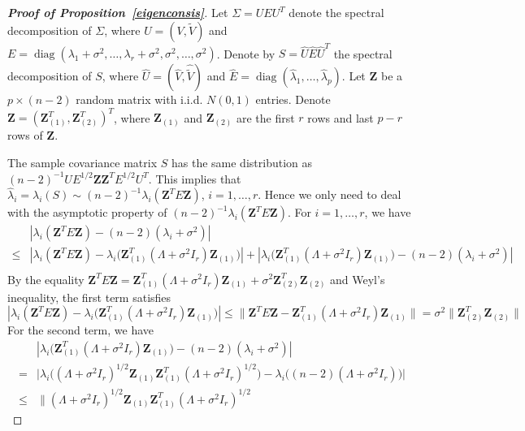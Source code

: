 \documentclass[review]{elsarticle}
\DeclareMathOperator{\mydiag}{diag}
\newcommand{\bZ}{\mathbf{Z}}
\theoremstyle{plain}
\theoremstyle{definition}
\theoremstyle{remark}
\begin{document}
\begin{proof}[\textbf{Proof of Proposition~\ref{eigenconsis}}]
    Let $\Sigma=UEU^T$ denote the spectral decomposition of $\Sigma$, where
     $U=(V,\tilde{V})$ and $E=\mydiag(\lambda_1+\sigma^2,\ldots,\lambda_r+\sigma^2,\sigma^2,\ldots,\sigma^2)$.
Denote by $S=\hat{U}\hat{E}\hat{U}^T$ the spectral decomposition of $S$, where $\hat{U}=(\hat{V},\hat{\tilde{V}})$ and $\hat{E}=\mydiag(\hat{\lambda}_1,\ldots,\hat{\lambda}_p)$.
Let $\bZ$ be a $p\times (n-2)$ random matrix with i.i.d. $N(0,1)$ entries.
Denote $\bZ={(\bZ_{(1)}^T,\bZ_{(2)}^T)}^T$, where $\bZ_{(1)}$ and $\bZ_{(2)}$ are the first $r$ rows and last $p-r$ rows of $\bZ$. 

    {\color{red}
The sample covariance matrix $S$ has the same distribution as
$
    {(n-2)}^{-1} U E^{1/2} \bZ \bZ^T E^{1/2} U^T
$.
This implies that $\hat{\lambda}_i=\lambda_i(S)\sim (n-2)^{-1}\lambda_i(\bZ^T E \bZ)$, $i=1,\ldots,r$.
Hence we only need to deal with the asymptotic property of $(n-2)^{-1}\lambda_i(\bZ^T E \bZ)$.
For $i=1,\ldots,r$, we have
    \begin{equation*}
        \begin{aligned}
            &|\lambda_i(\bZ^T E \bZ)-(n-2)(\lambda_i +\sigma^2)|\\
            \leq&
            |\lambda_i(\bZ^T E \bZ)-\lambda_i \big(\bZ_{(1)}^T(\Lambda+\sigma^2 I_r)\bZ_{(1)}\big)|
            +
|\lambda_i \big(\bZ_{(1)}^T(\Lambda+\sigma^2 I_r)\bZ_{(1)}\big)
        -(n-2)(\lambda_i +\sigma^2)|\\
        \end{aligned}
    \end{equation*}
    By the equality
$
    \bZ^T E \bZ= \bZ_{(1)}^T (\Lambda +\sigma^2 I_r) \bZ_{(1)}+
\sigma^2 \bZ_{(2)}^T  \bZ_{(2)}
$
and Weyl's inequality, the first term satisfies
$$
            |\lambda_i(\bZ^T E \bZ)-\lambda_i \big(\bZ_{(1)}^T(\Lambda+\sigma^2 I_r)\bZ_{(1)}\big)|
            \leq \|\bZ^T E \bZ-\bZ_{(1)}^T(\Lambda+\sigma^2 I_r)\bZ_{(1)}\|
            =\sigma^2\|\bZ_{(2)}^T  \bZ_{(2)}\|
    $$
For the second term, we have
$$
    \begin{aligned}
        &|\lambda_i \big(\bZ_{(1)}^T(\Lambda+\sigma^2 I_r)\bZ_{(1)}\big)-(n-2)(\lambda_i +\sigma^2)|\\
        =&
    \big|\lambda_i \big((\Lambda+\sigma^2 I_r)^{1/2}\bZ_{(1)}\bZ_{(1)}^T(\Lambda+\sigma^2 I_r)^{1/2}\big)
        -\lambda_i\big((n-2)(\Lambda+\sigma^2 I_r)\big)\big|\\
        \leq &
        \|
     (\Lambda+\sigma^2 I_r)^{1/2}\bZ_{(1)}\bZ_{(1)}^T(\Lambda+\sigma^2 I_r)^{1/2}

\end{aligned}$$}
\end{proof}
\end{document}
